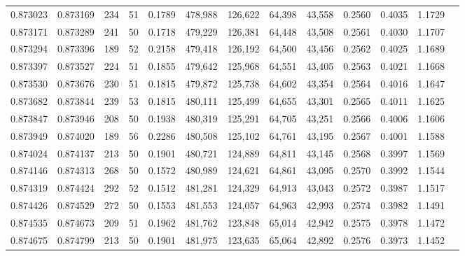 \begin{tabular}{rrrrrrrrrrrrr}
0.873023 & 0.873169 &   234 &  51 &                                     0.1789 & 478,988 & 126,622 &  64,398 &  43,558 & 0.2560 & 0.4035 & 1.1729 \\
0.873171 & 0.873289 &   241 &  50 &                                     0.1718 & 479,229 & 126,381 &  64,448 &  43,508 & 0.2561 & 0.4030 & 1.1707 \\
0.873294 & 0.873396 &   189 &  52 &                                     0.2158 & 479,418 & 126,192 &  64,500 &  43,456 & 0.2562 & 0.4025 & 1.1689 \\
0.873397 & 0.873527 &   224 &  51 &                                     0.1855 & 479,642 & 125,968 &  64,551 &  43,405 & 0.2563 & 0.4021 & 1.1668 \\
0.873530 & 0.873676 &   230 &  51 &                                     0.1815 & 479,872 & 125,738 &  64,602 &  43,354 & 0.2564 & 0.4016 & 1.1647 \\
0.873682 & 0.873844 &   239 &  53 &                                     0.1815 & 480,111 & 125,499 &  64,655 &  43,301 & 0.2565 & 0.4011 & 1.1625 \\
0.873847 & 0.873946 &   208 &  50 &                                     0.1938 & 480,319 & 125,291 &  64,705 &  43,251 & 0.2566 & 0.4006 & 1.1606 \\
0.873949 & 0.874020 &   189 &  56 &                                     0.2286 & 480,508 & 125,102 &  64,761 &  43,195 & 0.2567 & 0.4001 & 1.1588 \\
0.874024 & 0.874137 &   213 &  50 &                                     0.1901 & 480,721 & 124,889 &  64,811 &  43,145 & 0.2568 & 0.3997 & 1.1569 \\
0.874146 & 0.874313 &   268 &  50 &                                     0.1572 & 480,989 & 124,621 &  64,861 &  43,095 & 0.2570 & 0.3992 & 1.1544 \\
0.874319 & 0.874424 &   292 &  52 &                                     0.1512 & 481,281 & 124,329 &  64,913 &  43,043 & 0.2572 & 0.3987 & 1.1517 \\
0.874426 & 0.874529 &   272 &  50 &                                     0.1553 & 481,553 & 124,057 &  64,963 &  42,993 & 0.2574 & 0.3982 & 1.1491 \\
0.874535 & 0.874673 &   209 &  51 &                                     0.1962 & 481,762 & 123,848 &  65,014 &  42,942 & 0.2575 & 0.3978 & 1.1472 \\
0.874675 & 0.874799 &   213 &  50 &                                     0.1901 & 481,975 & 123,635 &  65,064 &  42,892 & 0.2576 & 0.3973 & 1.1452 \\

\end{tabular}
